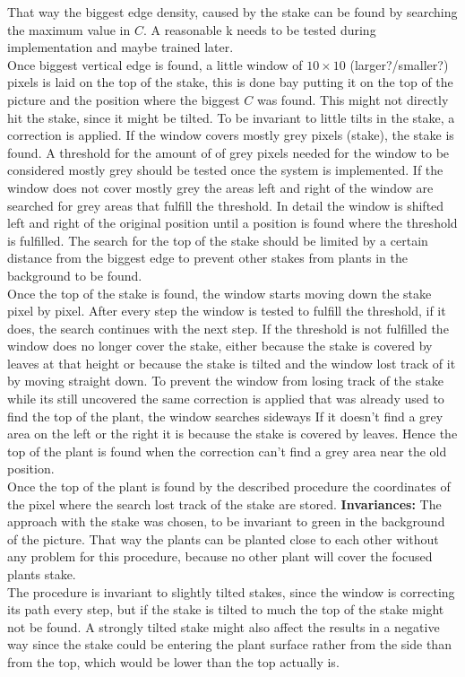 That way the biggest edge density, caused by the stake can be found by searching the maximum value in $C$. A reasonable k needs to be tested during implementation and maybe trained later.\\
Once biggest vertical edge is found, a little window of $10\times10$ (larger?/smaller?) pixels is laid on the top of the stake, this is done bay putting it on the top of the picture and the position where the biggest $C$ was found. This might not directly hit the stake, since it might be tilted. To be invariant to little tilts in the stake, a correction is applied. If the window covers mostly grey pixels (stake), the stake is found. A threshold for the amount of of grey pixels needed for the window to be considered mostly grey should be tested once the system is implemented. If the window does not cover mostly grey the areas left and right of the window are searched for grey areas that fulfill the threshold. In detail the window is shifted left and right of the original position until a position is found where the threshold is fulfilled. The search for the top of the stake should be limited by a certain distance from the biggest edge to prevent other stakes from plants in the background to be found.\\
Once the top of the stake is found, the window starts moving down the stake pixel by pixel. After every step the window is tested to fulfill the threshold, if it does, the search continues with the next step. If the threshold is not fulfilled the window does no longer cover the stake, either because the stake is covered by leaves at that height or because the stake is tilted and the window lost track of it by moving straight down. To prevent the window from losing track of the stake while its still uncovered the same correction is applied that was already used to find the top of the plant, the window searches sideways If it doesn't find a grey area on the left or the right it is because the stake is covered by leaves. Hence the top of the plant is found when the correction can't find a grey area near the old position.\\ 
Once the top of the plant is found by the described procedure the coordinates of the pixel where the search lost track of the stake are stored.
\textbf{Invariances:} The approach with the stake was chosen, to be invariant to green in the background of the picture. That way the plants can be planted close to each other without any problem for this procedure, because no other plant will cover the focused plants stake.\\
The procedure is invariant to slightly tilted stakes, since the window is correcting its path every step, but if the stake is tilted to much the top of the stake might not be found. A strongly tilted stake might also affect the results in a negative way since the stake could be entering the plant surface rather from the side than from the top, which would be lower than the top actually is.

